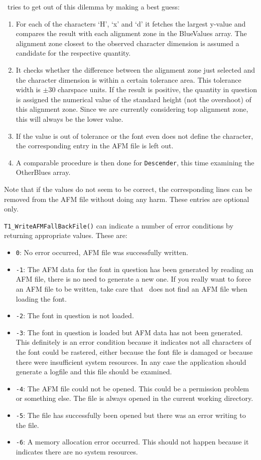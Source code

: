 \tonelib\ tries to get out of this dilemma by making a best guess:
\begin{enumerate}
\item For each of the characters `H', `x' and `d' it fetches the
  largest y-value and compares the result with each alignment zone in
  the BlueValues array. The alignment zone closest to the observed
  character dimension is assumed a candidate for the respective
  quantity. 
\item It checks whether the difference between the alignment zone just
  selected and the character dimension is within a certain tolerance
  area. This tolerance width is $\pm 30$ charspace units. If the
  result is positive, the quantity in question is assigned the
  numerical value of the standard height (not the overshoot) of this
  alignment zone. Since we are currently considering top
  alignment zone, this will always be the lower value. 
\item If the value is out of tolerance or the font even does not
  define the character, the corresponding entry in the AFM file is left
  out.
\item A comparable procedure is then done for \verb+Descender+, this
  time examining the OtherBlues array.
\end{enumerate}
Note that if the values do not seem to be correct, the corresponding
lines can be removed from the AFM file without doing any harm. These
entries are optional only.

\verb+T1_WriteAFMFallBackFile()+ can indicate  a number of error
conditions by returning appropriate values. These are:
\begin{itemize}
\item \verb+0+: No error occurred, AFM file was successfully written.
\item \verb+-1+: The AFM data for the font in question has been
  generated by reading an AFM file, there is no need to generate a new
  one. If you really want to force an AFM file to be written, take
  care that \tonelib\ does not find an AFM file when loading the
  font. 
\item \verb+-2+: The font in question is not loaded.
\item \verb+-3+: The font in question is loaded but AFM data has not
  been generated. This definitely is an error condition because it
  indicates not all characters of the font could be rastered, either
  because the font file is damaged or because there were 
  insufficient system resources. In any case the application should
  generate a logfile and this file should be examined.
\item \verb+-4+: The AFM file could not be opened. This could be a
  permission problem or something else. The file is always opened in
  the current working directory.
\item \verb+-5+: The file has successfully been opened but there was
  an error writing to the file.
\item \verb+-6+: A memory allocation error occurred. This should not
  happen because it indicates there are no system resources. 
\end{itemize}



